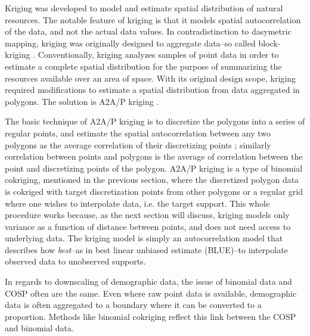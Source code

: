 Kriging was developed to model and estimate spatial distribution of natural resources.  The notable feature of kriging is that it models spatial autocorrelation of the data, and not the actual data values.  In contradistinction to dasymetric mapping, kriging was originally designed to aggregate data--so called block-kriging \citep{cressie90, matheron63}.  Conventionally, kriging analyzes samples of point data in order to estimate a complete spatial distribution for the purpose of summarizing the resources available over an area of space.  With its original design scope, kriging required modifications to estimate a spatial distribution from data aggregated in polygons.  The solution is A2A/P kriging \citep{krivoruchko11, kyriakidis04}.

The basic technique of A2A/P kriging is to discretize the polygons into a series of regular points, and estimate the spatial autocorrelation between any two polygons as the average correlation of their discretizing points \citep{kyriakidis04}; similarly correlation between points and polygons is the average of correlation between the point and discretizing points of the polygon.  A2A/P kriging is a type of binomial cokriging, mentioned in the previous section, where the discretized polygon data is cokriged with target discretization points from other polygons or a regular grid where one wishes to interpolate data, i.e. the target support.  This whole procedure works because, as the next section will discuss, kriging models only variance as a function of distance between points, and does not need access to underlying data.  The kriging model is simply an autocorrelation model that describes how {\em best}--as in best linear unbiased estimate (BLUE)--to interpolate observed data to unobserved supports.

In regards to downscaling of demographic data, the issue of binomial data and COSP often are the same.  Even where raw point data is available, demographic data is often aggregated to a boundary where it can be converted to a proportion.  Methods like binomial cokriging reflect this link between the COSP and binomial data.


